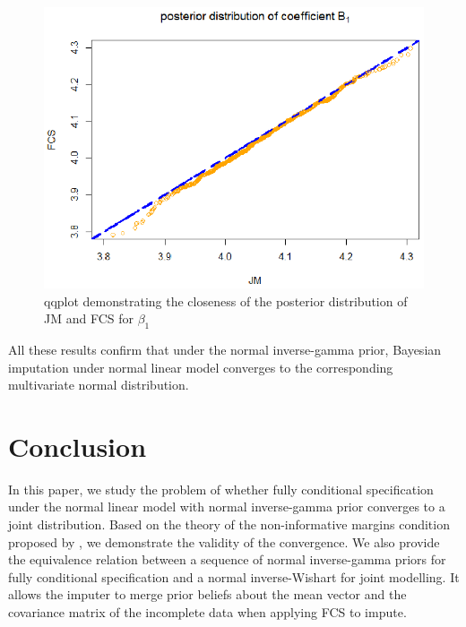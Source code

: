 	\begin{figure}[h]
		\centering
		\includegraphics[scale=0.7]{plots/plot5.1.eps}
		\caption{qqplot demonstrating the closeness of the posterior distribution of JM and FCS for $\beta_{1}$}
		\label{fig5_1}
	\end{figure} 
	
	All these results confirm that under the normal inverse-gamma prior, Bayesian imputation under normal linear model converges to the corresponding multivariate normal distribution. 
	
	\section{Conclusion}
	In this paper, we study the problem of whether fully conditional specification under the normal linear model with normal inverse-gamma prior converges to a joint distribution. Based on the theory of the non-informative margins condition proposed by \citet{hughes2014joint}, we demonstrate the validity of the convergence. We also provide the equivalence relation between a sequence of normal inverse-gamma priors for fully conditional specification and a normal inverse-Wishart for joint modelling. It allows the imputer to merge prior beliefs about the mean vector and the covariance matrix of the incomplete data when applying FCS to impute. 
	
